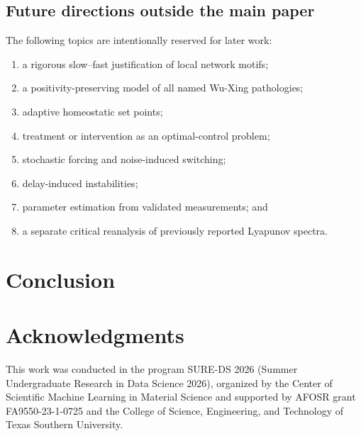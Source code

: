 \documentclass[11pt, reqno]{amsart}
\theoremstyle{definition}
\theoremstyle{remark}
\begin{document}
	\subsection{Future directions outside the main paper}
	
	The following topics are intentionally reserved for later work:
	\begin{enumerate}[label=(\roman*),leftmargin=2.5em]
		\item a rigorous slow--fast justification of local network motifs;
		\item a positivity-preserving model of all named Wu-Xing pathologies;
		\item adaptive homeostatic set points;
		\item treatment or intervention as an optimal-control problem;
		\item stochastic forcing and noise-induced switching;
		\item delay-induced instabilities;
		\item parameter estimation from validated measurements; and
		\item a separate critical reanalysis of previously reported Lyapunov
		spectra.
	\end{enumerate}
	
	\section{Conclusion}
	\label{sec:conclusion}
	
	
	\section*{Acknowledgments}
	
	This work was conducted in the program SURE-DS 2026 (Summer Undergraduate
	Research in Data Science 2026), organized by the Center of Scientific Machine
	Learning in Material Science and supported by AFOSR grant FA9550-23-1-0725 and
	the College of Science, Engineering, and Technology of Texas Southern
	University.
	
\end{document}
